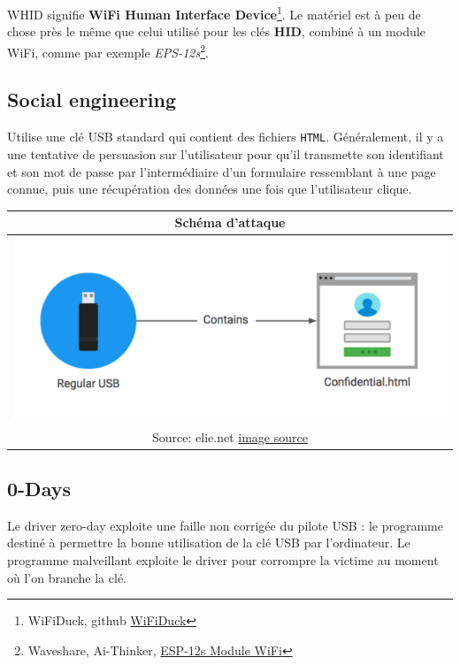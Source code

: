 \documentclass[
  french,
  paper=a4,
  ,captions=tableheading
]{scrartcl}
\begin{document}
WHID signifie \textbf{WiFi Human Interface Device}\footnote{WiFiDuck,
  github \href{https://github.com/SpacehuhnTech/WiFiDuck}{WiFiDuck}}. Le
matériel est à peu de chose près le même que celui utilisé pour les clés
\textbf{HID}, combiné à un module WiFi, comme par exemple
\emph{EPS-12s}\footnote{Waveshare, Ai-Thinker,
  \href{https://www.waveshare.com/esp-12s.htm}{ESP-12s Module WiFi}}.

\hypertarget{social-engineering}{%
\subsection{Social engineering}\label{social-engineering}}

Utilise une clé USB standard qui contient des fichiers \texttt{HTML}.
Généralement, il y a une tentative de persuasion sur l'utilisateur pour
qu'il transmette son identifiant et son mot de passe par l'intermédiaire
d'un formulaire ressemblant à une page connue, puis une récupération des
données une fois que l'utilisateur clique.

\begin{longtable}[]{@{}c@{}}
\toprule
Schéma d'attaque\tabularnewline
\midrule
\endhead
\includegraphics{images/2.png}\tabularnewline
Source: elie.net
\href{https://elie.net/blog/security/what-are-malicious-usb-keys-and-how-to-create-a-realistic-one/}{image
source}\tabularnewline
\bottomrule
\end{longtable}

\hypertarget{days}{%
\subsection{0-Days}\label{days}}

Le driver zero-day exploite une faille non corrigée du pilote USB : le
programme destiné à permettre la bonne utilisation de la clé USB par
l'ordinateur. Le programme malveillant exploite le driver pour corrompre
la victime au moment où l'on branche la clé.
\end{document}
